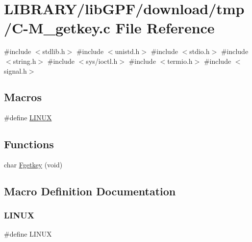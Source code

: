 \hypertarget{C-M__getkey_8c}{}\section{L\+I\+B\+R\+A\+R\+Y/lib\+G\+P\+F/download/tmp/\+C-\/\+M\+\_\+getkey.c File Reference}
\label{C-M__getkey_8c}
{\ttfamily \#include $<$stdlib.\+h$>$}\newline
{\ttfamily \#include $<$unistd.\+h$>$}\newline
{\ttfamily \#include $<$stdio.\+h$>$}\newline
{\ttfamily \#include $<$string.\+h$>$}\newline
{\ttfamily \#include $<$sys/ioctl.\+h$>$}\newline
{\ttfamily \#include $<$termio.\+h$>$}\newline
{\ttfamily \#include $<$signal.\+h$>$}\newline
\subsection*{Macros}
\begin{DoxyCompactItemize}
\item 
\#define \hyperlink{C-M__getkey_8c_a157a956e14c5c44b3f73ef23a4776f64}{L\+I\+N\+UX}
\end{DoxyCompactItemize}
\subsection*{Functions}
\begin{DoxyCompactItemize}
\item 
char \hyperlink{C-M__getkey_8c_a257d1f3a5480d15d83e0bf1d43647afc}{Fgetkey} (void)
\end{DoxyCompactItemize}


\subsection{Macro Definition Documentation}
\mbox{\label{C-M__getkey_8c_a157a956e14c5c44b3f73ef23a4776f64}} 
\subsubsection{\texorpdfstring{L\+I\+N\+UX}{LINUX}}
{\footnotesize\ttfamily \#define L\+I\+N\+UX}



